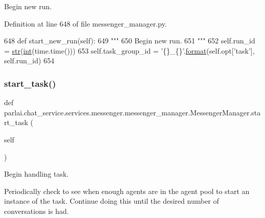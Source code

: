 \begin{DoxyVerb}Begin new run.
\end{DoxyVerb}
 

Definition at line 648 of file messenger\+\_\+manager.\+py.


\begin{DoxyCode}
648     \textcolor{keyword}{def }start\_new\_run(self):
649         \textcolor{stringliteral}{"""}
650 \textcolor{stringliteral}{        Begin new run.}
651 \textcolor{stringliteral}{        """}
652         self.run\_id = \hyperlink{namespacegenerate__task__READMEs_a5b88452ffb87b78c8c85ececebafc09f}{str}(\hyperlink{namespacelanguage__model_1_1eval__ppl_a7d12ee00479673c5c8d1f6d01faa272a}{int}(time.time()))
653         self.task\_group\_id = \textcolor{stringliteral}{'\{\}\_\{\}'}.\hyperlink{namespaceparlai_1_1chat__service_1_1services_1_1messenger_1_1shared__utils_a32e2e2022b824fbaf80c747160b52a76}{format}(self.opt[\textcolor{stringliteral}{'task'}], self.run\_id)
654 
\end{DoxyCode}
\mbox{\label{classparlai_1_1chat__service_1_1services_1_1messenger_1_1messenger__manager_1_1MessengerManager_a6bd1cf187d6a26e57b22e11800734734}} 
\subsubsection{\texorpdfstring{start\+\_\+task()}{start\_task()}}
{\footnotesize\ttfamily def parlai.\+chat\+\_\+service.\+services.\+messenger.\+messenger\+\_\+manager.\+Messenger\+Manager.\+start\+\_\+task (\begin{DoxyParamCaption}\item[{}]{self }\end{DoxyParamCaption})}

\begin{DoxyVerb}Begin handling task.

Periodically check to see when enough agents are in the agent pool to start an
instance of the task. Continue doing this until the desired number of
conversations is had.
\end{DoxyVerb}
 

